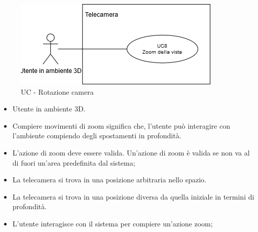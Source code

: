 \begin{figure}[h!]
    \centering
    \includegraphics[scale=0.7]{template/images/UC8.png}
    \caption{UC - Rotazione camera}
\end{figure}
\UCdsc
{ %
    \begin{itemize}
        \item Utente in ambiente 3D.
    \end{itemize}
}
{ %
    \begin{itemize}
        \item Compiere movimenti di zoom significa che, l'utente può interagire con l'ambiente compiendo degli spostamenti in profondità.
    \end{itemize}
}
{ %
    \begin{itemize}
        \item L'azione di zoom deve essere valida. Un'azione di zoom è valida se non va al di fuori un'area predefinita dal sistema;
        \item La telecamera si trova in una posizione arbitraria nello spazio.
    \end{itemize}
}
{ %
    \begin{itemize}
        \item La telecamera si trova in una posizione diversa da quella iniziale in termini di profondità.
    \end{itemize}
}
{ %
    \begin{itemize}
        \item L'utente interagisce con il sistema per compiere un'azione zoom;
    \end{itemize}
}

